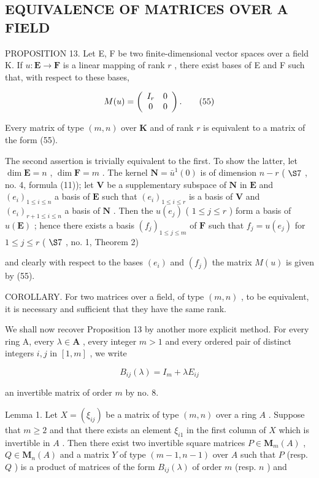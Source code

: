 \subsection{EQUIVALENCE OF MATRICES OVER A FIELD}

PROPOSITION 13. Let E, F be two finite-dimensional vector spaces over a field K. If \(u: \mathbf{E} \to \mathbf{F}\) is a linear mapping of rank \(r\) , there exist bases of E and F such that, with respect to these bases,

\[
M (u) = \left( \begin{array}{c c} I _ {r} & 0 \\ 0 & 0 \end{array} \right).\tag{55}
\]

Every matrix of type \((m, n)\) over \(\mathbf{K}\) and of rank \(r\) is equivalent to a matrix of the form (55).

The second assertion is trivially equivalent to the first. To show the latter, let \(\dim \mathbf{E} = n\) , \(\dim \mathbf{F} = m\) . The kernel \(\mathbf{N} = \bar{u}^{1}(0)\) is of dimension \(n - r\) ( \(\S 7\) , no. 4, formula (11)); let \(\mathbf{V}\) be a supplementary subspace of \(\mathbf{N}\) in \(\mathbf{E}\) and \((e_i)_{1 \leqslant i \leqslant n}\) a basis of \(\mathbf{E}\) such that \((e_i)_{1 \leqslant i \leqslant r}\) is a basis of \(\mathbf{V}\) and \((e_i)_{r + 1 \leqslant i \leqslant n}\) a basis of \(\mathbf{N}\) . Then the \(u(e_j)\) ( \(1 \leqslant j \leqslant r\) ) form a basis of \(u(\mathbf{E})\) ; hence there exists a basis \((f_j)_{1 \leqslant j \leqslant m}\) of \(\mathbf{F}\) such that \(f_j = u(e_j)\) for \(1 \leqslant j \leqslant r\) ( \(\S 7\) , no. 1, Theorem 2)

and clearly with respect to the bases \((e_{i})\) and \((f_{j})\) the matrix \(M(u)\) is given by (55).

COROLLARY. For two matrices over a field, of type \((m, n)\) , to be equivalent, it is necessary and sufficient that they have the same rank.

We shall now recover Proposition 13 by another more explicit method. For every ring A, every \(\lambda \in \mathbf{A}\) , every integer \(m > 1\) and every ordered pair of distinct integers \(i, j\) in \([1, m]\) , we write

\[
B _ {i j} (\lambda) = I _ {m} + \lambda E _ {i j}\tag{56}
\]

an invertible matrix of order \(m\) by no. 8.

Lemma 1. Let \(X = (\xi_{ij})\) be a matrix of type \((m, n)\) over a ring \(A\) . Suppose that \(m \geqslant 2\) and that there exists an element \(\xi_{i1}\) in the first column of \(X\) which is invertible in \(A\) . Then there exist two invertible square matrices \(P \in \mathbf{M}_m(A)\) , \(Q \in \mathbf{M}_n(A)\) and a matrix \(Y\) of type \((m - 1, n - 1)\) over \(A\) such that \(P\) (resp. \(Q\) ) is a product of matrices of the form \(B_{ij}(\lambda)\) of order \(m\) (resp. \(n\) ) and

